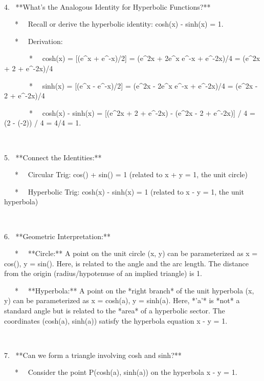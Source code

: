 \documentclass{article}
\begin{document}
{\

4. \ **What's the Analogous Identity for Hyperbolic Functions?**

\ \ \ * \ \ Recall or derive the hyperbolic identity:
cosh{\texttwosuperior}(x) - sinh{\texttwosuperior}(x) = 1.

\ \ \ * \ \ Derivation:

\ \ \ \ \ \ \ * \ \ cosh{\texttwosuperior}(x) = [(e\^{}x +
e\^{}-x)/2]{\texttwosuperior} = (e\^{}2x + 2e\^{}x e\^{}-x + e\^{}-2x)/4 =
(e\^{}2x + 2 + e\^{}-2x)/4

\ \ \ \ \ \ \ * \ \ sinh{\texttwosuperior}(x) = [(e\^{}x -
e\^{}-x)/2]{\texttwosuperior} = (e\^{}2x - 2e\^{}x e\^{}-x + e\^{}-2x)/4 =
(e\^{}2x - 2 + e\^{}-2x)/4

\ \ \ \ \ \ \ * \ \ cosh{\texttwosuperior}(x) - sinh{\texttwosuperior}(x) =
[(e\^{}2x + 2 + e\^{}-2x) - (e\^{}2x - 2 + e\^{}-2x)] / 4 = (2 - (-2)) / 4 =
4/4 = 1.

\

5. \ **Connect the Identities:**

\ \ \ * \ \ Circular Trig: cos{\texttwosuperior}({\theta}) +
sin{\texttwosuperior}({\theta}) = 1 (related to x{\texttwosuperior} +
y{\texttwosuperior} = 1, the unit circle)

\ \ \ * \ \ Hyperbolic Trig: cosh{\texttwosuperior}(x) -
sinh{\texttwosuperior}(x) = 1 (related to x{\texttwosuperior} -
y{\texttwosuperior} = 1, the unit hyperbola)

\

6. \ **Geometric Interpretation:**

\ \ \ * \ \ **Circle:** A point on the unit circle (x, y) can be
parameterized as x = cos({\theta}), y = sin({\theta}). Here, {\theta} is
related to the angle and the arc length. The distance from the origin
(radius/hypotenuse of an implied triangle) is 1.

\ \ \ * \ \ **Hyperbola:** A point on the *right branch* of the unit
hyperbola (x, y) can be parameterized as x = cosh(a), y = sinh(a). Here, *'a'*
is *not* a standard angle but is related to the *area* of a hyperbolic sector.
The coordinates (cosh(a), sinh(a)) satisfy the hyperbola equation
x{\texttwosuperior} - y{\texttwosuperior} = 1.

\

7. \ **Can we form a triangle involving cosh and sinh?**

\ \ \ * \ \ Consider the point P(cosh(a), sinh(a)) on the hyperbola
x{\texttwosuperior} - y{\texttwosuperior} = 1.

}
\end{document}
